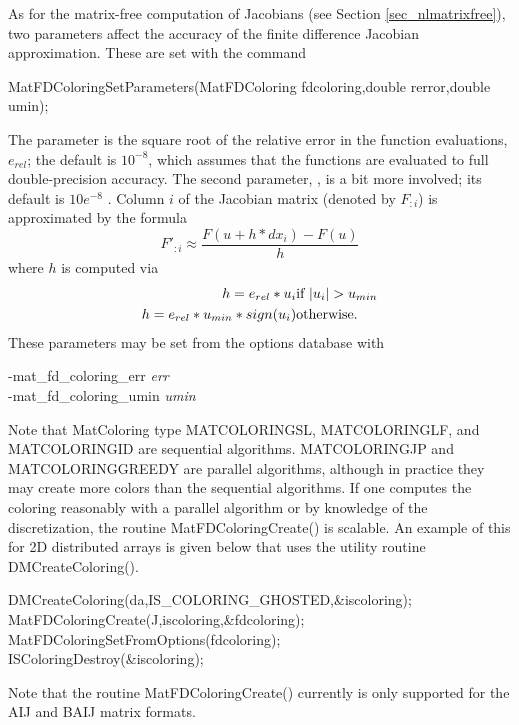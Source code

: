As for the matrix-free computation of Jacobians (see Section
\ref{sec_nlmatrixfree}), two parameters affect the accuracy of the
finite difference Jacobian approximation.  These are set with the command
\begin{tabbing}
  MatFDColoringSetParameters(MatFDColoring fdcoloring,double rerror,double umin);
\end{tabbing}
The parameter  is the square root of
the relative error in the function evaluations, $e_{rel}$; the default is $ 10^{-8} $, which assumes
that the functions are evaluated to full double-precision accuracy. The
second parameter, , is a bit more involved; its default is
$ 10e^{-8} $ .  Column $i$ of the Jacobian matrix (denoted by $F_{:i}$) is
approximated by the formula
\[
    F'_{:i} \approx \frac{F(u + h*dx_{i}) - F(u)}{h}
\]
where $ h $ is computed via
\begin{eqnarray*}
        h = e_{rel}*u_{i}             &    \hbox{if }  |u_{i}| > u_{min} \\
        h = e_{rel}*u_{min}*sign(u_{i})  &    \hbox{otherwise}.
\end{eqnarray*}
These parameters may be set from the options database with
\begin{tabbing}
   -mat\_fd\_coloring\_err {\em err}\\
   -mat\_fd\_coloring\_umin {\em umin}
\end{tabbing}
 

Note that MatColoring type MATCOLORINGSL, MATCOLORINGLF, and MATCOLORINGID are sequential algorithms.  MATCOLORINGJP and
MATCOLORINGGREEDY are parallel algorithms, although in practice they may create more colors than the sequential
algorithms.  If one computes the coloring  reasonably with a parallel algorithm or by knowledge of the
discretization, the routine MatFDColoringCreate() is scalable.  An example of this for 2D distributed arrays is given
below that uses the utility routine DMCreateColoring().

\begin{tabbing}
   DMCreateColoring(da,IS\_COLORING\_GHOSTED,\&iscoloring);\\
   MatFDColoringCreate(J,iscoloring,\&fdcoloring); \\
   MatFDColoringSetFromOptions(fdcoloring);\\
   ISColoringDestroy(\&iscoloring);
\end{tabbing}

Note that the routine MatFDColoringCreate() currently is only supported for the AIJ and BAIJ matrix formats.

